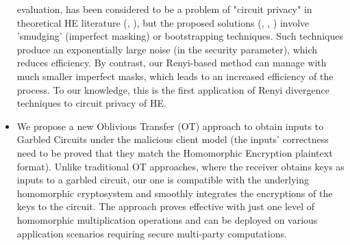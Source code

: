 \begin{itemize}
  evaluation, has been considered to be a problem of "circuit privacy" in theoretical HE
  literature (\cite{sander1999non}, \cite{ishai2007evaluating}), but the
  proposed solutions (\cite{homenc}, \cite{ostrovsky2014maliciously},
  \cite{gentry2010hop}) involve 'smudging' (imperfect masking) or bootstrapping
  techniques. Such techniques produce an exponentially large noise (in the security parameter), which
  reduces efficiency. By contrast, our Renyi-based method can manage with much smaller
  imperfect masks, which leads to an increased efficiency of the process. To our knowledge, this is the first application of
  Renyi divergence techniques to circuit privacy of HE.
\item We propose a new Oblivious Transfer (OT) approach to obtain inputs to
  Garbled Circuits under the malicious client model (the inputs' correctness need to be proved that they match the Homomorphic Encryption plaintext format). Unlike traditional OT approaches, where the receiver obtains
  keys as inputs to a garbled circuit, our one is compatible with the
  underlying homomorphic cryptosystem and smoothly integrates the encryptions of the
  keys to the circuit. The approach proves effective with just one level of
  homomorphic multiplication operations and can be deployed on various application
  scenarios requiring secure multi-party computations.
\end{itemize}

